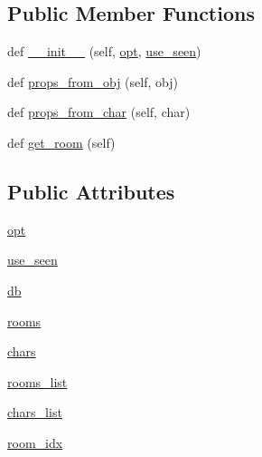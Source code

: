 \subsection*{Public Member Functions}
\begin{DoxyCompactItemize}
\item 
def \hyperlink{classlight__chats_1_1run_1_1GraphGenerator_aac2b7559d6b74c923297239c810ed53f}{\+\_\+\+\_\+init\+\_\+\+\_\+} (self, \hyperlink{classlight__chats_1_1run_1_1GraphGenerator_a3060edf4bd46a5e1a78dbc48f539d341}{opt}, \hyperlink{classlight__chats_1_1run_1_1GraphGenerator_a81da652d9cbc091fba5d410630750c39}{use\+\_\+seen})
\item 
def \hyperlink{classlight__chats_1_1run_1_1GraphGenerator_a757544b95a6b132d89a0e27dc98511f4}{props\+\_\+from\+\_\+obj} (self, obj)
\item 
def \hyperlink{classlight__chats_1_1run_1_1GraphGenerator_a3b33b3e258b5d31a586a43b484bda91c}{props\+\_\+from\+\_\+char} (self, char)
\item 
def \hyperlink{classlight__chats_1_1run_1_1GraphGenerator_aa59d2f6eb662add984d10f89d25ccab4}{get\+\_\+room} (self)
\end{DoxyCompactItemize}
\subsection*{Public Attributes}
\begin{DoxyCompactItemize}
\item 
\hyperlink{classlight__chats_1_1run_1_1GraphGenerator_a3060edf4bd46a5e1a78dbc48f539d341}{opt}
\item 
\hyperlink{classlight__chats_1_1run_1_1GraphGenerator_a81da652d9cbc091fba5d410630750c39}{use\+\_\+seen}
\item 
\hyperlink{classlight__chats_1_1run_1_1GraphGenerator_a0c0a9acbec3d441069dc15d78ed357fc}{db}
\item 
\hyperlink{classlight__chats_1_1run_1_1GraphGenerator_aff14ffc413151e1665e23759d5f20667}{rooms}
\item 
\hyperlink{classlight__chats_1_1run_1_1GraphGenerator_a3a7d4254e7381805d70735c33110e488}{chars}
\item 
\hyperlink{classlight__chats_1_1run_1_1GraphGenerator_a8e98e856aa61d7d4a07ab4e212cec333}{rooms\+\_\+list}
\item 
\hyperlink{classlight__chats_1_1run_1_1GraphGenerator_adb64c1437325f8797b0d6a7cdd9d6692}{chars\+\_\+list}
\item 
\hyperlink{classlight__chats_1_1run_1_1GraphGenerator_aeaacf5bfa9cccecca2e21a91d5b3a9ce}{room\+\_\+idx}
\end{DoxyCompactItemize}


